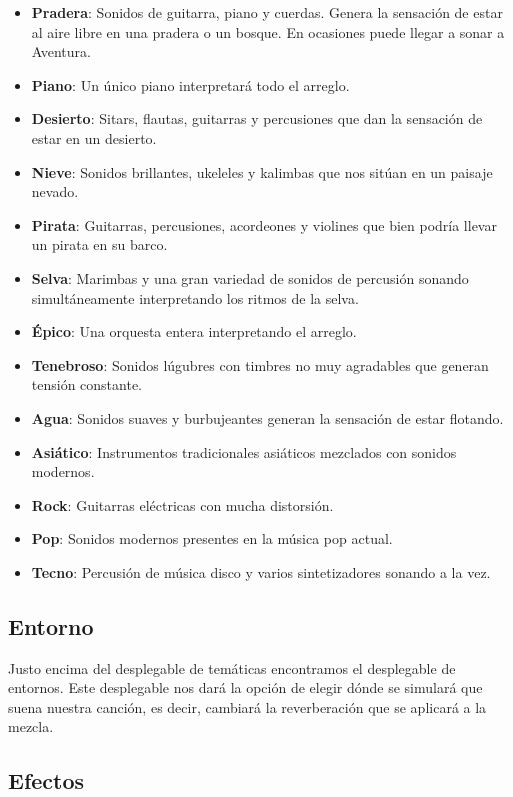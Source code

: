 \begin{itemize}
    \item \textbf{Pradera}: Sonidos de guitarra, piano y cuerdas. Genera la sensación de estar al aire libre en una pradera o un bosque. En ocasiones puede llegar a sonar a Aventura.
    \item \textbf{Piano}: Un único piano interpretará todo el arreglo.
    \item \textbf{Desierto}: Sitars, flautas, guitarras y percusiones que dan la sensación de estar en un desierto.
    \item \textbf{Nieve}: Sonidos brillantes, ukeleles y kalimbas que nos sitúan en un paisaje nevado.
    \item \textbf{Pirata}: Guitarras, percusiones, acordeones y violines que bien podría llevar un pirata en su barco. 
    \item \textbf{Selva}: Marimbas y una gran variedad de sonidos de percusión sonando simultáneamente interpretando los ritmos de la selva.
    \item \textbf{Épico}: Una orquesta entera interpretando el arreglo. 
    \item \textbf{Tenebroso}: Sonidos lúgubres con timbres no muy agradables que generan tensión constante.
    \item \textbf{Agua}: Sonidos suaves y burbujeantes generan la sensación de estar flotando.
    \item \textbf{Asiático}: Instrumentos tradicionales asiáticos mezclados con sonidos modernos.
    \item \textbf{Rock}: Guitarras eléctricas con mucha distorsión.
    \item \textbf{Pop}: Sonidos modernos presentes en la música pop actual.
    \item \textbf{Tecno}: Percusión de música disco y varios sintetizadores sonando a la vez.
\end{itemize}

\subsection{Entorno}
\label{subsec:app:reverb}
Justo encima del desplegable de temáticas encontramos el desplegable de entornos. Este desplegable nos dará la opción de elegir dónde se simulará que suena nuestra canción, es decir, cambiará la reverberación que se aplicará a la mezcla.

\subsection{Efectos}
\label{subsec:app:effects}

